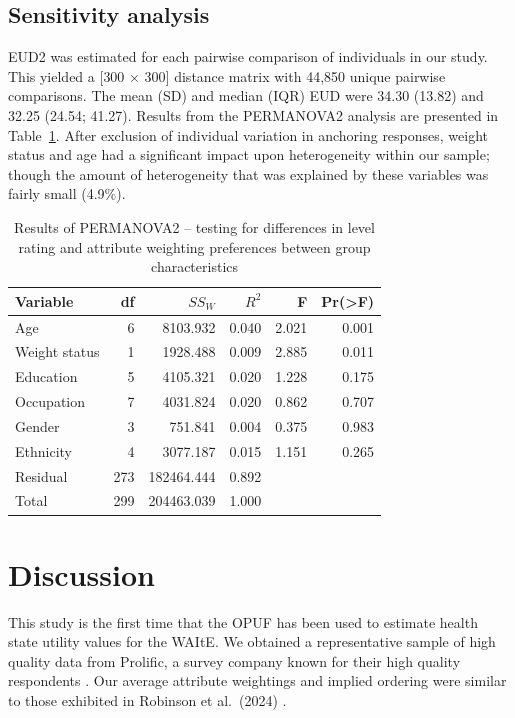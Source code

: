 \documentclass[
  number,
  preprint]{elsarticle}
\begin{document}
\subsection{Sensitivity analysis}\label{sensitivity-analysis-1}

EUD2 was estimated for each pairwise comparison of individuals in our
study. This yielded a {[}300 \(\times\) 300{]} distance matrix with
44,850 unique pairwise comparisons. The mean (SD) and median (IQR) EUD
were 34.30 (13.82) and 32.25 (24.54; 41.27). Results from the PERMANOVA2
analysis are presented in Table~\ref{tbl-permanova2}. After exclusion of
individual variation in anchoring responses, weight status and age had a
significant impact upon heterogeneity within our sample; though the
amount of heterogeneity that was explained by these variables was fairly
small (4.9\%).

\begin{longtable}[]{@{}lrrrrr@{}}

\caption{\label{tbl-permanova2}Results of PERMANOVA2 -- testing for
differences in level rating and attribute weighting preferences between
group characteristics}

\tabularnewline

\toprule\noalign{}
Variable & df & \(SS_W\) & \(R^2\) & F & Pr(\textgreater F) \\
\midrule\noalign{}
\endhead
\bottomrule\noalign{}
\endlastfoot
Age & 6 & 8103.932 & 0.040 & 2.021 & 0.001 \\
Weight status & 1 & 1928.488 & 0.009 & 2.885 & 0.011 \\
Education & 5 & 4105.321 & 0.020 & 1.228 & 0.175 \\
Occupation & 7 & 4031.824 & 0.020 & 0.862 & 0.707 \\
Gender & 3 & 751.841 & 0.004 & 0.375 & 0.983 \\
Ethnicity & 4 & 3077.187 & 0.015 & 1.151 & 0.265 \\
Residual & 273 & 182464.444 & 0.892 & & \\
Total & 299 & 204463.039 & 1.000 & & \\

\end{longtable}

\section{Discussion}\label{discussion}

This study is the first time that the OPUF has been used to estimate
health state utility values for the WAItE. We obtained a representative
sample of high quality data from Prolific, a survey company known for
their high quality respondents \citep{Peer2022DataResearch}. Our average
attribute weightings and implied ordering were similar to those
exhibited in Robinson et al.~(2024) \citep{Robinson2024AUKValue}.
\end{document}
